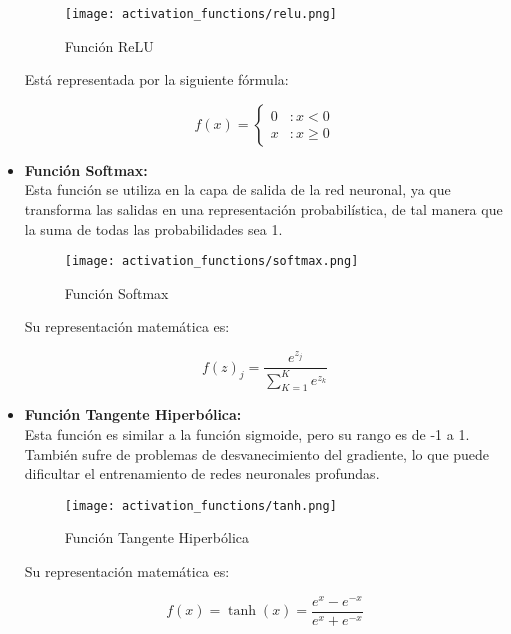 \begin{itemize}
                \begin{figure}[H]
                    \centering
                    \texttt{[image: activation\_functions/relu.png]}
                    \caption{Función ReLU}
                    \label{fig:relu_function}
                \end{figure}

                Está representada por la siguiente fórmula:

                \[
                f(x) = \left\{ \begin{array}{lr} 
                0 & : x < 0 \\
                x & : x \ge 0 
                \end{array} \right.
                \]
            
            \item \textbf{Función Softmax:} \\
                Esta función se utiliza en la capa de salida de la red neuronal, ya que transforma las salidas en una representación probabilística, de tal manera que la suma de todas las probabilidades sea 1.
                \begin{figure}[H]
                    \centering
                    \texttt{[image: activation\_functions/softmax.png]}
                    \caption{Función Softmax}
                    \label{fig:softmax_function}
                \end{figure}

                Su representación matemática es:

                \[
                f(z)_j = \frac{e^{z_j}}{\sum_{K=1}^{K} e^{z_k}}
                \]
            
            \item \textbf{Función Tangente Hiperbólica:} \\
                Esta función es similar a la función sigmoide, pero su rango es de -1 a 1. También sufre de problemas de desvanecimiento del gradiente, lo que puede dificultar el entrenamiento de redes neuronales profundas.

                \begin{figure}[H]
                    \centering
                    \texttt{[image: activation\_functions/tanh.png]}
                    \caption{Función Tangente Hiperbólica}
                    \label{fig:tanh_function}
                \end{figure}

                Su representación matemática es:

                \[
                f(x) = \tanh(x) = \frac{e^x - e^{-x}}{e^x + e^{-x}}
                \]
        
        \end{itemize}
        

